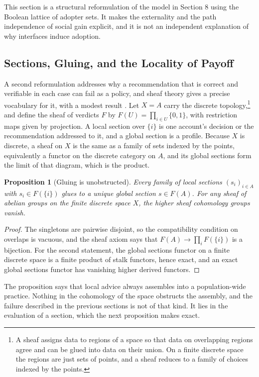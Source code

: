 \documentclass[12pt]{article}
\theoremstyle{plain}
\newtheorem{proposition}{Proposition}
\theoremstyle{definition}
\begin{document}
This section is a structural reformulation of the model in Section 8 using the Boolean lattice of adopter sets. It makes the externality and the path independence of social gain explicit, and it is not an independent explanation of why interfaces induce adoption.

\subsection{Sections, Gluing, and the Locality of Payoff}

A second reformulation addresses why a recommendation that is correct and verifiable in each case can fail as a policy, and sheaf theory gives a precise vocabulary for it, with a modest result \cite{maclanemoerdijk1992}. Let $X=A$ carry the discrete topology,\footnote{A sheaf assigns data to regions of a space so that data on overlapping regions agree and can be glued into data on their union. On a finite discrete space the regions are just sets of points, and a sheaf reduces to a family of choices indexed by the points.} and define the sheaf of verdicts $F$ by $F(U)=\prod_{i\in U}\{0,1\}$, with restriction maps given by projection. A local section over $\{i\}$ is one account's decision or the recommendation addressed to it, and a global section is a profile. Because $X$ is discrete, a sheaf on $X$ is the same as a family of sets indexed by the points, equivalently a functor on the discrete category on $A$, and its global sections form the limit of that diagram, which is the product.

\begin{proposition}[Gluing is unobstructed]
Every family of local sections $(s_i)_{i\in A}$ with $s_i\in F(\{i\})$ glues to a unique global section $s\in F(A)$. For any sheaf of abelian groups on the finite discrete space $X$, the higher sheaf cohomology groups vanish.
\end{proposition}

\begin{proof}
The singletons are pairwise disjoint, so the compatibility condition on overlaps is vacuous, and the sheaf axiom says that $F(A)\to\prod_i F(\{i\})$ is a bijection. For the second statement, the global sections functor on a finite discrete space is a finite product of stalk functors, hence exact, and an exact global sections functor has vanishing higher derived functors.
\end{proof}

The proposition says that local advice always assembles into a population-wide practice. Nothing in the cohomology of the space obstructs the assembly, and the failure described in the previous sections is not of that kind. It lies in the evaluation of a section, which the next proposition makes exact.
\end{document}

